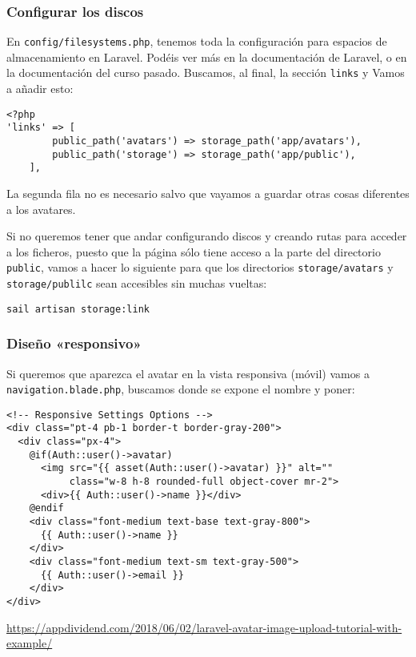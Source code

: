 \documentclass[11pt]{article}
\begin{document}
\subsubsection{Configurar los discos}
\label{sec:orge154055}
En \texttt{config/filesystems.php}, tenemos toda la configuración para
espacios de almacenamiento en Laravel. Podéis ver más en la
documentación de Laravel, o en la documentación del curso pasado.
Buscamos, al final, la sección \texttt{links} y Vamos a añadir esto:
\begin{verbatim}
<?php
'links' => [
        public_path('avatars') => storage_path('app/avatars'),
        public_path('storage') => storage_path('app/public'),
    ],
\end{verbatim}
La segunda fila no es necesario salvo que vayamos a guardar otras
cosas diferentes a los avatares.

Si no queremos tener que andar configurando discos y creando rutas
para acceder a los ficheros, puesto que la página sólo tiene acceso a
la parte del directorio \texttt{public}, vamos a hacer lo siguiente para que
los directorios \texttt{storage/avatars} y \texttt{storage/publilc} sean accesibles
sin muchas vueltas:
\begin{verbatim}
sail artisan storage:link
\end{verbatim}

\subsubsection{Diseño «responsivo»}
\label{sec:orgd20dd6f}
Si queremos que aparezca el avatar en la vista responsiva (móvil)
vamos a \texttt{navigation.blade.php}, buscamos donde se expone el nombre y
poner:
\begin{verbatim}
<!-- Responsive Settings Options -->
<div class="pt-4 pb-1 border-t border-gray-200">
  <div class="px-4">
    @if(Auth::user()->avatar)
      <img src="{{ asset(Auth::user()->avatar) }}" alt=""
           class="w-8 h-8 rounded-full object-cover mr-2">
      <div>{{ Auth::user()->name }}</div>
    @endif
    <div class="font-medium text-base text-gray-800">
      {{ Auth::user()->name }}
    </div>
    <div class="font-medium text-sm text-gray-500">
      {{ Auth::user()->email }}
    </div>
</div>
\end{verbatim}

\newpage

\url{https://appdividend.com/2018/06/02/laravel-avatar-image-upload-tutorial-with-example/}
\end{document}
